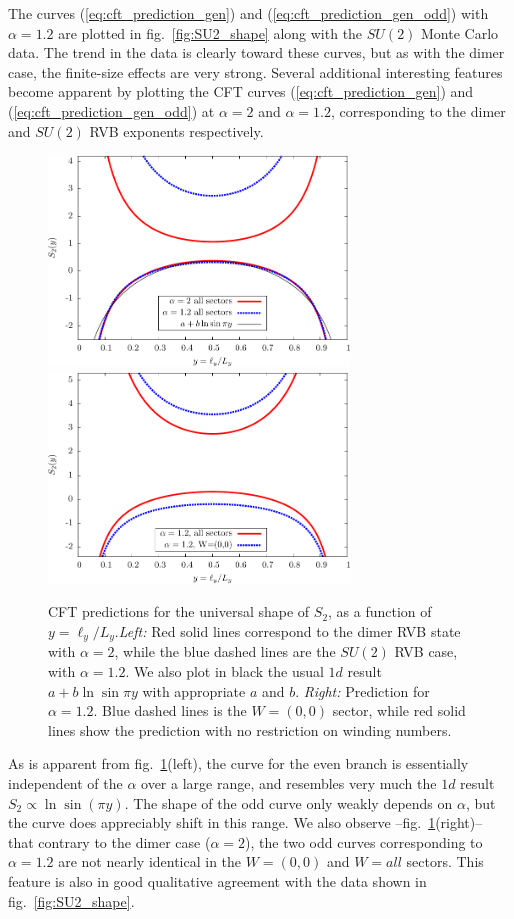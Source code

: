 \documentclass[11pt]{iopart}
\begin{document}
The curves (\ref{eq:cft_prediction_gen}) and (\ref{eq:cft_prediction_gen_odd}) 
 with $\alpha=1.2$ are plotted in fig.~\ref{fig:SU2_shape} along with the $SU(2)$ Monte Carlo data.  The trend in the data is clearly toward these curves, but as with the dimer case, the finite-size effects are very strong. 
Several additional interesting features become apparent by plotting the CFT curves
(\ref{eq:cft_prediction_gen}) and (\ref{eq:cft_prediction_gen_odd}) at $\alpha=2$ and $\alpha=1.2$, corresponding to the dimer and $SU(2)$ RVB exponents respectively.
\begin{figure}[ht]
 \begin{center}
  \includegraphics[width=8cm]{./figures/SUN_CFT.pdf}
    \includegraphics[width=8cm]{./figures/SUN_CFT_w.pdf}
 \end{center}
\caption{CFT predictions for the universal shape of $S_2$, as a function of $y=\ell_y/L_y$.\emph{Left:} Red solid lines correspond to the dimer RVB state with $\alpha=2$, while the blue dashed lines are the $SU(2)$ RVB case, with $\alpha= 1.2$. We also plot in black the usual $1d$ result $a+b\ln \sin \pi y$ with appropriate $a$ and $b$. \emph{Right: }Prediction for $\alpha=1.2$. Blue dashed lines is the $W=(0,0)$ sector, while red solid lines show the prediction with no restriction on winding numbers.}
\label{fig:SUN_CFT}
\end{figure}
As is apparent from fig.~\ref{fig:SUN_CFT}(left), the curve for the even branch is essentially independent of the $\alpha$ over a large range, and resembles very much the $1d$ result $S_2\propto\ln \sin (\pi y)$. The shape of the odd curve only weakly depends on $\alpha$, but the curve does appreciably shift in this range. We also observe --fig.~\ref{fig:SUN_CFT}(right)-- that contrary to the dimer case ($\alpha=2$), the two odd curves corresponding to $\alpha=1.2$ are not nearly identical in the $W=(0,0)$ and $W=all$ sectors. This feature is also in good qualitative agreement with the data shown in fig.~\ref{fig:SU2_shape}.
\end{document}

